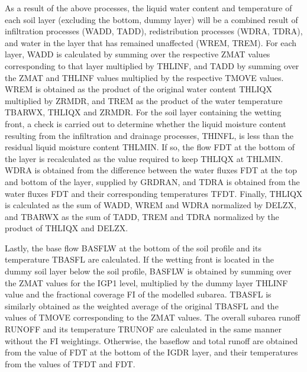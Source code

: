 As a result of the above processes, the liquid water content and temperature of each soil layer (excluding the bottom, dummy layer) will be a combined result of infiltration processes (W\+A\+D\+D, T\+A\+D\+D), redistribution processes (W\+D\+R\+A, T\+D\+R\+A), and water in the layer that has remained unaffected (W\+R\+E\+M, T\+R\+E\+M). For each layer, W\+A\+D\+D is calculated by summing over the respective Z\+M\+A\+T values corresponding to that layer multiplied by T\+H\+L\+I\+N\+F, and T\+A\+D\+D by summing over the Z\+M\+A\+T and T\+H\+L\+I\+N\+F values multiplied by the respective T\+M\+O\+V\+E values. W\+R\+E\+M is obtained as the product of the original water content T\+H\+L\+I\+Q\+X multiplied by Z\+R\+M\+D\+R, and T\+R\+E\+M as the product of the water temperature T\+B\+A\+R\+W\+X, T\+H\+L\+I\+Q\+X and Z\+R\+M\+D\+R. For the soil layer containing the wetting front, a check is carried out to determine whether the liquid moisture content resulting from the infiltration and drainage processes, T\+H\+I\+N\+F\+L, is less than the residual liquid moisture content T\+H\+L\+M\+I\+N. If so, the flow F\+D\+T at the bottom of the layer is recalculated as the value required to keep T\+H\+L\+I\+Q\+X at T\+H\+L\+M\+I\+N. W\+D\+R\+A is obtained from the difference between the water fluxes F\+D\+T at the top and bottom of the layer, supplied by G\+R\+D\+R\+A\+N, and T\+D\+R\+A is obtained from the water fluxes F\+D\+T and their corresponding temperatures T\+F\+D\+T. Finally, T\+H\+L\+I\+Q\+X is calculated as the sum of W\+A\+D\+D, W\+R\+E\+M and W\+D\+R\+A normalized by D\+E\+L\+Z\+X, and T\+B\+A\+R\+W\+X as the sum of T\+A\+D\+D, T\+R\+E\+M and T\+D\+R\+A normalized by the product of T\+H\+L\+I\+Q\+X and D\+E\+L\+Z\+X.

Lastly, the base flow B\+A\+S\+F\+L\+W at the bottom of the soil profile and its temperature T\+B\+A\+S\+F\+L are calculated. If the wetting front is located in the dummy soil layer below the soil profile, B\+A\+S\+F\+L\+W is obtained by summing over the Z\+M\+A\+T values for the I\+G\+P1 level, multiplied by the dummy layer T\+H\+L\+I\+N\+F value and the fractional coverage F\+I of the modelled subarea. T\+B\+A\+S\+F\+L is similarly obtained as the weighted average of the original T\+B\+A\+S\+F\+L and the values of T\+M\+O\+V\+E corresponding to the Z\+M\+A\+T values. The overall subarea runoff R\+U\+N\+O\+F\+F and its temperature T\+R\+U\+N\+O\+F are calculated in the same manner without the F\+I weightings. Otherwise, the baseflow and total runoff are obtained from the value of F\+D\+T at the bottom of the I\+G\+D\+R layer, and their temperatures from the values of T\+F\+D\+T and F\+D\+T.